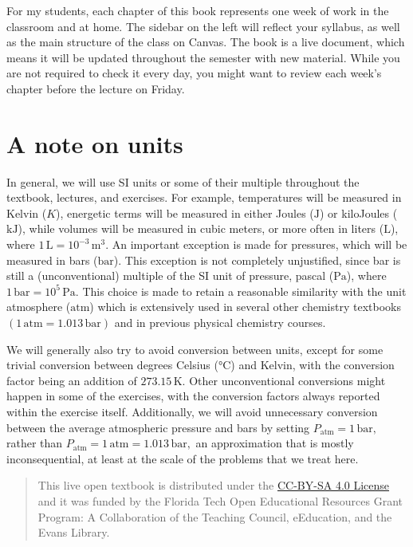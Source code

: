 \documentclass[
  9pt,
]{extbook}
\theoremstyle{definition}
\theoremstyle{definition}
\theoremstyle{definition}
\theoremstyle{definition}
\theoremstyle{remark}
\begin{document}
For my students, each chapter of this book represents one week of work in the classroom and at home. The sidebar on the left will reflect your syllabus, as well as the main structure of the class on Canvas. The book is a live document, which means it will be updated throughout the semester with new material. While you are not required to check it every day, you might want to review each week's chapter before the lecture on Friday.

\section*{A note on units}\label{a-note-on-units}

In general, we will use SI units or some of their multiple throughout the textbook, lectures, and exercises. For example, temperatures will be measured in Kelvin (\(K\)), energetic terms will be measured in either Joules (\(\text{J}\)) or kiloJoules (\(\text{kJ}\)), while volumes will be measured in cubic meters, or more often in liters (\(\text{L}\)), where \(1\,\text{L} = 10^{-3}\,\text{m}^3\). An important exception is made for pressures, which will be measured in bars (\(\text{bar}\)). This exception is not completely unjustified, since bar is still a (unconventional) multiple of the SI unit of pressure, pascal (\(\text{Pa}\)), where \(1\,\text{bar} = 10^5\,\text{Pa}\). This choice is made to retain a reasonable similarity with the unit atmosphere (\(\text{atm}\)) which is extensively used in several other chemistry textbooks \((1\,\text{atm} = 1.013\,\text{bar})\) and in previous physical chemistry courses.

We will generally also try to avoid conversion between units, except for some trivial conversion between degrees Celsius (°C) and Kelvin, with the conversion factor being an addition of \(273.15\,\text{K}\). Other unconventional conversions might happen in some of the exercises, with the conversion factors always reported within the exercise itself.
Additionally, we will avoid unnecessary conversion between the average atmospheric pressure and bars by setting \(P_{\text{atm}} = 1\,\text{bar},\) rather than \(P_{\text{atm}} = 1\,\text{atm} = 1.013\, \text{bar},\) an approximation that is mostly inconsequential, at least at the scale of the problems that we treat here.

\begin{quote}
This live open textbook is distributed under the \href{https://creativecommons.org/licenses/by-sa/4.0/}{CC-BY-SA 4.0 License} and it was funded by the Florida Tech Open Educational Resources Grant Program: A Collaboration of the Teaching Council, eEducation, and the Evans Library.
\end{quote}
\end{document}
